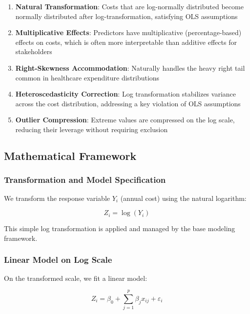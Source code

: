 \begin{enumerate}
    \item \textbf{Natural Transformation}: Costs that are log-normally distributed become normally distributed after log-transformation, satisfying OLS assumptions
    
    \item \textbf{Multiplicative Effects}: Predictors have multiplicative (percentage-based) effects on costs, which is often more interpretable than additive effects for stakeholders
    
    \item \textbf{Right-Skewness Accommodation}: Naturally handles the heavy right tail common in healthcare expenditure distributions
    
    \item \textbf{Heteroscedasticity Correction}: Log transformation stabilizes variance across the cost distribution, addressing a key violation of OLS assumptions
    
    \item \textbf{Outlier Compression}: Extreme values are compressed on the log scale, reducing their leverage without requiring exclusion
\end{enumerate}

\subsection{Mathematical Framework}

\subsubsection{Transformation and Model Specification}

We transform the response variable $Y_i$ (annual cost) using the natural logarithm:

\begin{equation}
Z_i = \log(Y_i)
\end{equation}

This simple log transformation is applied and managed by the base modeling framework.

\subsubsection{Linear Model on Log Scale}

On the transformed scale, we fit a linear model:

\begin{equation}
Z_i = \beta_0 + \sum_{j=1}^{p} \beta_j x_{ij} + \varepsilon_i
\end{equation}

